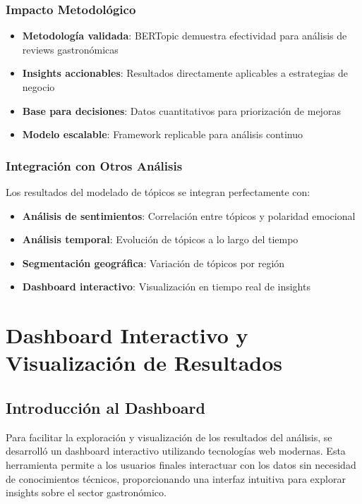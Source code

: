 \documentclass[12pt,a4paper,twoside,openany]{book}
\begin{document}
\subsection{Impacto Metodológico}

\begin{itemize}
    \item \textbf{Metodología validada}: BERTopic demuestra efectividad para análisis de reviews gastronómicas
    \item \textbf{Insights accionables}: Resultados directamente aplicables a estrategias de negocio
    \item \textbf{Base para decisiones}: Datos cuantitativos para priorización de mejoras
    \item \textbf{Modelo escalable}: Framework replicable para análisis continuo
\end{itemize}

\subsection{Integración con Otros Análisis}

Los resultados del modelado de tópicos se integran perfectamente con:
\begin{itemize}
    \item \textbf{Análisis de sentimientos}: Correlación entre tópicos y polaridad emocional
    \item \textbf{Análisis temporal}: Evolución de tópicos a lo largo del tiempo
    \item \textbf{Segmentación geográfica}: Variación de tópicos por región
    \item \textbf{Dashboard interactivo}: Visualización en tiempo real de insights
\end{itemize}

\chapter{Dashboard Interactivo y Visualización de Resultados}

\section{Introducción al Dashboard}

Para facilitar la exploración y visualización de los resultados del análisis, se desarrolló un dashboard interactivo utilizando tecnologías web modernas. Esta herramienta permite a los usuarios finales interactuar con los datos sin necesidad de conocimientos técnicos, proporcionando una interfaz intuitiva para explorar insights sobre el sector gastronómico.
\end{document}
